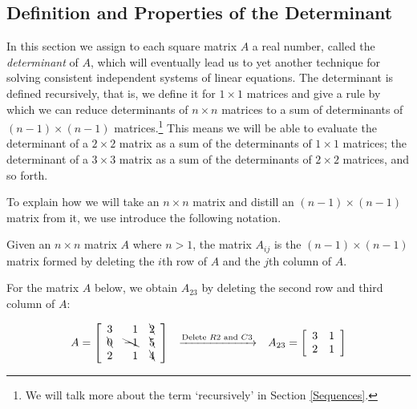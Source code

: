 \documentclass{ximera}
\begin{document}
	\author{Stitz-Zeager}




\setcounter{footnote}{0}

\label{Determinants}

\setlength{\extrarowheight}{0pt}

\subsection{Definition and Properties of the Determinant}

\label{determinantdefnandprops}

In this section we assign to each square matrix $A$ a real number, called the \textit{determinant} of $A$, which will eventually lead us to yet another technique for solving consistent independent systems of linear equations.  The determinant is defined recursively, that is, we define it for $1 \times 1$ matrices and give a rule by which we can reduce determinants of $n \times n$ matrices to a sum of determinants of $(n-1) \times (n-1)$ matrices.\footnote{We will talk more about the term `recursively' in Section \ref{Sequences}.}  This means we will be able to evaluate the determinant of a $2 \times 2$ matrix as a sum of the determinants of $1 \times 1$ matrices;  the determinant of a $3 \times 3$ matrix as a sum of the determinants of $2 \times 2$ matrices, and so forth.  

To explain how we will take an $n \times n$ matrix and distill an $(n-1) \times (n-1)$ matrix from it, we use introduce the following notation.

 

\begin{definition} \label{Aijdefn} Given an $n \times n$ matrix $A$ where $n>1$, the matrix $A_{ij}$ is the $(n-1) \times (n-1)$ matrix formed by deleting the $i$th row of $A$ and the $j$th column of $A$. 
\end{definition}

 

For the matrix $A$ below, we obtain $A_{23}$ by deleting the second row and third column of $A$:

\[ \begin{array}{ccc}

A = \left[ \begin{array}{rrr} 3 &  1 & \bcancel{2} \\  \bcancel{0} & \bcancel{-1} & \bcancel{5} \\ 2 & 1 & \bcancel{4}  \end{array} \right]
&
\xrightarrow{\text{Delete $R2$ and $C3$}}

&

A_{23} = \left[ \begin{array}{rr} 3 & 1 \\ 2 & 1 \\ \end{array} \right] \\

\end{array}\]
\end{document}
